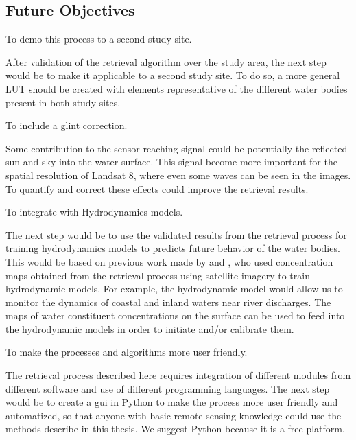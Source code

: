 \subsection{Future Objectives}
	\begin{enumerate}

			{\bf \item To demo this process to a second study site.}

After validation of the retrieval algorithm over the study area, the next step would be to make it applicable to a second study site. To do so, a more general LUT should be created with elements representative of the different water bodies present in both study sites.

			{\bf \item To include a glint correction.}

Some contribution to the sensor-reaching signal could be potentially the reflected sun and sky into the water surface. This signal become more important for the spatial resolution of Landsat 8, where even some waves can be seen in the images. To quantify and correct these effects could improve the retrieval results.

			{\bf \item To integrate with Hydrodynamics models.} 

The next step would be to use the validated results from the retrieval process for training hydrodynamics models to predicts future behavior of the water bodies. This would be based on previous work made by \cite{Pahlevan:2012} and \cite{GeraceThesis}, who used concentration maps obtained from the retrieval process using satellite imagery to train hydrodynamic models. For example, the hydrodynamic model would allow us to monitor the dynamics of coastal and inland waters near river discharges. The maps of water constituent concentrations on the surface can be used to feed into the hydrodynamic models in order to initiate and/or calibrate them. 

			{\bf \item To make the processes and algorithms more user friendly.} 

The retrieval process described here requires integration of different modules from different software and use of different programming languages. The next step would be to create a \gls{gui} in Python to make the process more user friendly and automatized, so that anyone with basic remote sensing knowledge could use the methods describe in this thesis. We suggest Python because it is a free platform.


\end{enumerate}
